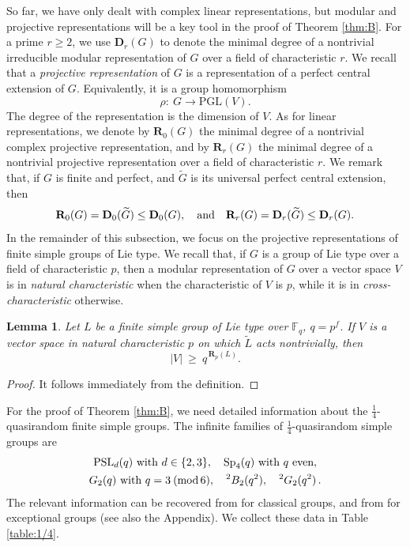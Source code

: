\documentclass{daj}
\newtheorem{lemma}[theorem]{Lemma}
\theoremstyle{definition}
\theoremstyle{remark}
\newcommand{\PSL}{\mathrm{PSL}}
\newcommand{\D}{\mathbf{D}}
\newcommand{\Di}{\mathbf{R}}
\begin{document}
So far, we have only dealt with complex linear representations, but modular and projective representations
will be a key tool in the proof of Theorem \ref{thm:B}.
For a prime $r \geq 2$,
we use $\D_r(G)$ to denote the minimal degree of a nontrivial irreducible modular representation of $G$ over a field of characteristic $r$.
We recall that a {\itshape projective representation} of $G$ is a representation of a perfect central extension of $G$.
Equivalently, it is a group homomorphism
$$ \rho \colon \> G \to \mathrm{PGL}(V) . $$
The degree of the representation is the dimension of $V$.
As for linear representations, we denote by $\Di_0(G)$ the minimal degree of a nontrivial complex projective representation,
and by $\Di_r(G)$ the minimal degree of a nontrivial projective representation over a field of characteristic $r$.
We remark that, if $G$ is finite and perfect, and $\widetilde{G}$ is its universal perfect central extension, then
$$ \Di_0(G) = \D_0(\widetilde{G}) \leq \D_0(G), \quad\hbox{and} \quad \Di_r(G) =\D_r(\widetilde{G}) \leq \D_r(G) . $$
In the remainder of this subsection, we focus on the projective representations of finite simple groups of Lie type.
We recall that, if $G$ is a group of Lie type over a field of characteristic $p$,
then a modular representation of $G$ over a vector space $V$ is in {\itshape natural characteristic} when the characteristic of $V$ is $p$,
while it is in {\itshape cross-characteristic} otherwise.

\begin{lemma} \label{lemMinimalV}
	Let $L$ be a finite simple group of Lie type over $\mathbb{F}_q$, $q=p^f$.
	If $V$ is a vector space in natural characteristic $p$ on which $\widetilde{L}$ acts nontrivially, then
	$$ |V| \> \geq \> q^{\, \Di_p(L)} . $$
\end{lemma} 
\begin{proof} 
It follows immediately from the definition.
\end{proof}

For the proof of Theorem \ref{thm:B}, we need detailed information about the $\frac{1}{4}$-quasirandom finite simple groups.
The infinite families of $\frac{1}{4}$-quasirandom simple groups are
	\begin{gather*}
	\PSL_d(q) \hbox{ with }d\in\{2,3\}, \quad
	\mathrm{Sp}_4(q) \hbox{ with } q \hbox{ even}, \\
	G_2(q) \hbox{ with } q=3 \> (\mathrm{mod}\,6), \quad
	^2B_2(q^2), \quad
	^2G_2(q^2) \,. \end{gather*} 
	The relevant information can be recovered from \cite{LS74,SZ93} for classical groups,
	and from \cite[Sec. 4]{Lub01} for exceptional groups (see also the Appendix).
	We collect these data in Table \ref{table:1/4}.
	
\end{document}
